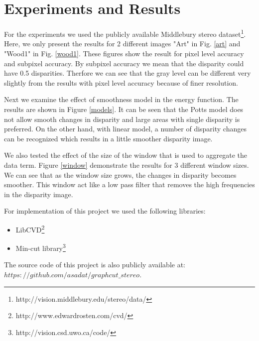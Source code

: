 \documentclass[letterpaper, 10 pt, conference]{ieeeconf}  %
\begin{document}
\section{Experiments and Results}
\label{exper}
For the experiments we used the publicly available Middlebury stereo dataset\footnote{http://vision.middlebury.edu/stereo/data/}. Here, we only present the results for 2 different images "Art" in Fig. \ref{art} and "Wood1" in Fig. \ref{wood1}. These figures show the result for pixel level accuracy and subpixel accuracy. By subpixel accuracy we mean that the disparity could have 0.5 disparities. Therfore we can see that the gray level can be different very slightly from the results with pixel level accuracy because of finer resolution.

Next we examine the effect of smoothness model in the energy function. The results are shown in Figure \ref{models}. It can be seen that the Potts model does not allow smooth changes in disparity and large areas with single disparity is preferred. On the other hand, with linear model, a number of disparity changes can be recognized which results in a little smoother disparity image.

We also tested the effect of the size of the window that is used to aggregate the data term. Figure \ref{window} demonstrate the results for 3 different window sizes. We can see that as the window size grows, the changes in disparity becomes smoother. This window act like a low pass filter that removes the high frequencies in the disparity image.

For implementation of this project we used the following libraries:
\begin{itemize}
\item LibCVD\footnote{http://www.edwardrosten.com/cvd/}
\item Min-cut library\footnote{http://vision.csd.uwo.ca/code/}
\end{itemize}
The source code of this project is also publicly available at: $https://github.com/asadat/graphcut\_stereo$.
\end{document}
